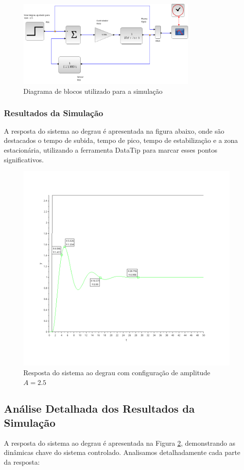 \begin{figure}[H]
    \centering
    \includegraphics[width=0.8\textwidth]{5-atividade/assets/diagrama-b.png}
    \caption{Diagrama de blocos utilizado para a simulação}
    \label{fig:diagrama_blocos_b}
\end{figure}
\subsubsection{Resultados da Simulação}
A resposta do sistema ao degrau é apresentada na figura abaixo, onde são destacados o tempo de subida, tempo de pico, tempo de estabilização e a zona estacionária, utilizando a ferramenta DataTip para marcar esses pontos significativos.

\begin{figure}[H]
    \centering
    \includegraphics[height=0.7\textwidth]{5-atividade/assets/simulation-b.png}
    \caption{Resposta do sistema ao degrau com configuração de amplitude \( A = 2.5 \)}
    \label{fig:simulation_5b}
\end{figure}

\subsection{Análise Detalhada dos Resultados da Simulação}
A resposta do sistema ao degrau é apresentada na Figura \ref{fig:simulation_5b}, demonstrando as dinâmicas chave do sistema controlado. Analisamos detalhadamente cada parte da resposta:

